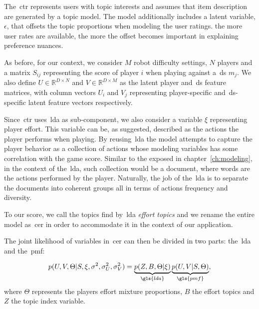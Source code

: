 The~\gls{ctr} represents users with topic interests and assumes that item description are generated by a topic model. The model additionally includes a latent variable, $\epsilon$, that offsets the topic proportions when modeling the user ratings. the more user rates are available, the more the offset becomes important in explaining preference nuances.

As before, for our context, we consider $M$ robot difficulty settings, $N$ players and a matrix $S_{ij}$ representing the score of player $i$ when playing against a~\gls{ds} $m_{j}$. We also define $U \in \mathbb{R}^{D\times N}$ and $V \in \mathbb{R}^{D\times M}$ as the latent player and~\gls{ds} feature matrices, with column vectors $U_i$ and $V_j$ representing player-specific and~\gls{ds}-specific latent feature vectors respectively. 

Since~\gls{ctr} uses~\gls{lda} as sub-component, we also consider a variable $\xi$ representing player effort. This variable can be, as suggested, described as the actions the player performs when playing. By reusing~\gls{lda} the model attempts to capture the player behavior as a collection of actions whose modeling variables has some correlation with the game score. Similar to the exposed in chapter~\ref{ch:modeling}, in the context of the~\gls{lda}, such collection would be a document, where words are the actions performed by the player. Naturally, the job of the~\gls{lda} is to separate the documents into coherent groups all in terms of actions frequency and diversity. 

To our score, we call the topics find by~\gls{lda} \textit{effort topics} and we rename the entire model as~\gls{cer} in order to accommodate it in the context of our application.

The joint likelihood of variables in~\gls{cer} can then be divided in two parts: the~\gls{lda} and the~\gls{pmf}:

\begin{equation}
    p(U,V,\Theta|S,\xi,\sigma^{2},\sigma_{U}^{2},\sigma_{V}^{2}) = \underbrace{p(Z,B, \Theta | \xi)}_{\gls{lda}} \underbrace{p(U,V|S,\Theta)}_{\gls{pmf}},
\end{equation}
where $\Theta$ represents the players effort mixture proportions, $B$ the effort topics and $Z$ the topic index variable. %


